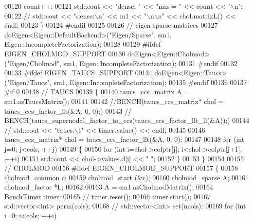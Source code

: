 \begin{DoxyCode}
{{00120             count++;
00121       std::cout << \textcolor{stringliteral}{"dense: "} << \textcolor{stringliteral}{"nnz = "} << count << \textcolor{stringliteral}{"\(\backslash\)n"};
00122 \textcolor{comment}{//       std::cout << "dense:\(\backslash\)n" << m1 << "\(\backslash\)n\(\backslash\)n" << chol.matrixL() << endl;}
00123     \}
00124 \textcolor{preprocessor}{    #endif}
00125 
00126     \textcolor{comment}{// eigen sparse matrices}
00127     doEigen<Eigen::DefaultBackend>(\textcolor{stringliteral}{"Eigen/Sparse"}, sm1, Eigen::IncompleteFactorization);
00128 
00129 \textcolor{preprocessor}{    #ifdef EIGEN\_CHOLMOD\_SUPPORT}
00130     doEigen<Eigen::Cholmod>(\textcolor{stringliteral}{"Eigen/Cholmod"}, sm1, Eigen::IncompleteFactorization);
00131 \textcolor{preprocessor}{    #endif}
00132 
00133 \textcolor{preprocessor}{    #ifdef EIGEN\_TAUCS\_SUPPORT}
00134     doEigen<Eigen::Taucs>(\textcolor{stringliteral}{"Eigen/Taucs"}, sm1, Eigen::IncompleteFactorization);
00135 \textcolor{preprocessor}{    #endif}
00136 
00137 \textcolor{preprocessor}{    #if 0}
00138     \textcolor{comment}{// TAUCS}
00139     \{
00140       taucs\_ccs\_matrix \hyperlink{group___core___module_class_eigen_1_1_matrix}{A} = sm1.asTaucsMatrix();
00141 
00142       \textcolor{comment}{//BENCH(taucs\_ccs\_matrix* chol = taucs\_ccs\_factor\_llt(&A, 0, 0);)}
00143 \textcolor{comment}{//       BENCH(taucs\_supernodal\_factor\_to\_ccs(taucs\_ccs\_factor\_llt\_ll(&A));)}
00144 \textcolor{comment}{//       std::cout << "taucs:\(\backslash\)t" << timer.value() << endl;}
00145 
00146       taucs\_ccs\_matrix* chol = taucs\_ccs\_factor\_llt(&A, 0, 0);
00147 
00148       \textcolor{keywordflow}{for} (\textcolor{keywordtype}{int} j=0; j<cols; ++j)
00149       \{
00150         \textcolor{keywordflow}{for} (\textcolor{keywordtype}{int} i=chol->colptr[j]; i<chol->colptr[j+1]; ++i)
00151           std::cout << chol->values.d[i] << \textcolor{stringliteral}{" "};
00152       \}
00153     \}
00154 
00155     \textcolor{comment}{// CHOLMOD}
00156 \textcolor{preprocessor}{    #ifdef EIGEN\_CHOLMOD\_SUPPORT}
00157     \{
00158       cholmod\_common c;
00159       cholmod\_start (&c);
00160       cholmod\_sparse A;
00161       cholmod\_factor *L;
00162 
00163       A = sm1.asCholmodMatrix();
00164       \hyperlink{class_eigen_1_1_bench_timer}{BenchTimer} timer;
00165 \textcolor{comment}{//       timer.reset();}
00166       timer.start();
00167       std::vector<int> perm(cols);
00168 \textcolor{comment}{//       std::vector<int> set(ncols);}
00169       \textcolor{keywordflow}{for} (\textcolor{keywordtype}{int} i=0; i<cols; ++i)
}}
\end{DoxyCode}

